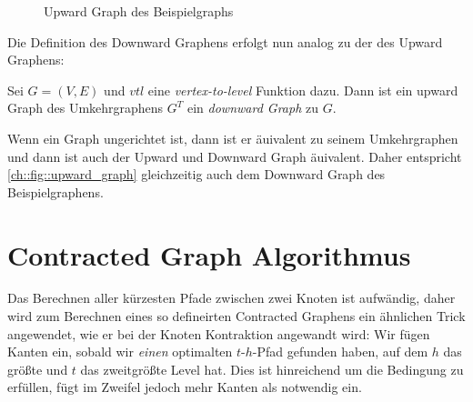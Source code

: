 \begin{figure}[ht]
  \caption{Upward Graph des Beispielgraphs}
  \label{ch::fig::upward_graph}
\end{figure}

Die Definition des Downward Graphens erfolgt nun analog zu der des Upward Graphens:

\begin{definition}
  Sei $G = (V, E)$ und ${vtl}$ eine \emph{vertex-to-level} Funktion dazu. Dann ist ein upward Graph des Umkehrgraphens $G^T$ ein \emph{downward Graph} zu $G$.
\end{definition}

Wenn ein Graph ungerichtet ist, dann ist er äuivalent zu seinem Umkehrgraphen und dann ist auch der Upward und Downward Graph äuivalent.
Daher entspricht \autoref{ch::fig::upward_graph} gleichzeitig auch dem Downward Graph des Beispielgraphens.


\section{Contracted Graph Algorithmus}

Das Berechnen aller kürzesten Pfade zwischen zwei Knoten ist aufwändig, daher wird zum Berechnen eines so defineirten Contracted Graphens ein ähnlichen Trick angewendet, wie er bei der Knoten Kontraktion angewandt wird:
Wir fügen Kanten ein, sobald wir \emph{einen} optimalten $t$-$h$-Pfad gefunden haben, auf dem $h$ das größte und $t$ das zweitgrößte Level hat.
Dies ist hinreichend um die Bedingung zu erfüllen, fügt im Zweifel jedoch mehr Kanten als notwendig ein.

